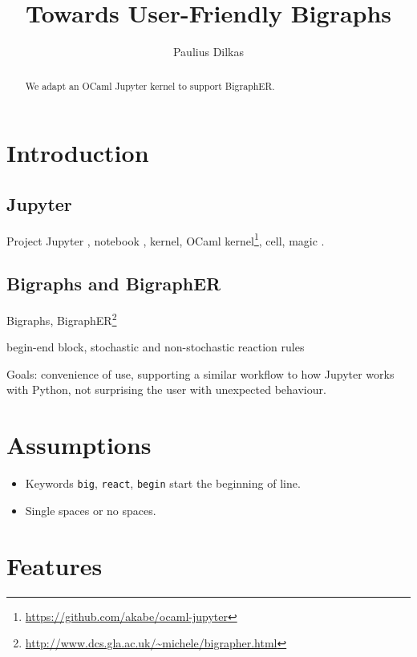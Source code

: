 \documentclass{article}
\author{Paulius Dilkas}
\title{Towards User-Friendly Bigraphs}
\begin{document}
\maketitle

\begin{abstract}
  We adapt an OCaml Jupyter kernel to support BigraphER.
\end{abstract}

\section{Introduction}

\subsection{Jupyter}

Project Jupyter \cite{website:jupyter}, notebook \cite{website:docs}, kernel,
OCaml kernel\footnote{\url{https://github.com/akabe/ocaml-jupyter}}, cell, magic
\cite{website:magic}.

\subsection{Bigraphs and BigraphER}

Bigraphs,
BigraphER\footnote{\url{http://www.dcs.gla.ac.uk/~michele/bigrapher.html}}
\cite{Sevegnani2016}

begin-end block, stochastic and non-stochastic reaction rules

Goals: convenience of use, supporting a similar workflow to how Jupyter works
with Python, not surprising the user with unexpected behaviour.

\section{Assumptions}

\begin{itemize}
\item Keywords \texttt{big}, \texttt{react}, \texttt{begin} start the beginning
  of line.
\item Single spaces or no spaces.
\end{itemize}

\section{Features}
\end{document}

